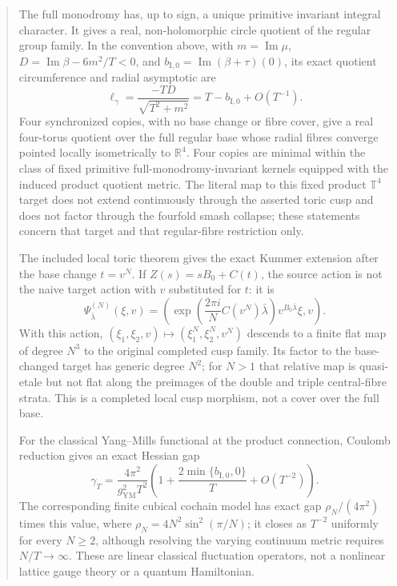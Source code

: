 \documentclass[11pt]{article}
\numberwithin{equation}{section}
\theoremstyle{definition}
\theoremstyle{remark}
\newcommand{\R}{\mathbb R}
\begin{document}
\begin{abstract}
The full monodromy has, up to sign, a unique primitive invariant integral character.  It gives a real, non-holomorphic circle quotient of the regular group family.  In the convention above, with $m=\operatorname{Im}\mu$, $D=\operatorname{Im}\beta-6m^2/T<0$, and $b_{\mathrm I,0}=\operatorname{Im}(\beta+\tau)(0)$, its exact quotient circumference and radial asymptotic are
\[
 \ell_\gamma=\frac{-TD}{\sqrt{T^2+m^2}}
 =T-b_{\mathrm I,0}+O(T^{-1}).
\]
Four synchronized copies, with no base change or fibre cover, give a real four-torus quotient over the full regular base whose radial fibres converge pointed locally isometrically to $\R^4$.  Four copies are minimal within the class of fixed primitive full-monodromy-invariant kernels equipped with the induced product quotient metric.  The literal map to this fixed product $\mathbb T^4$ target does not extend continuously through the asserted toric cusp and does not factor through the fourfold smash collapse; these statements concern that target and that regular-fibre restriction only.

The included local toric theorem gives the exact Kummer extension after the
base change $t=v^N$.  If $Z(s)=sB_0+C(t)$, the source action is not the
naive target action with $v$ substituted for $t$: it is
\[
 \Psi^{(N)}_{\bar\lambda}(\xi,v)
 =\left(\exp\!\left(\frac{2\pi i}{N}C(v^N)\bar\lambda\right)
 v^{B_0\bar\lambda}\xi,v\right).
\]
With this action, $(\xi_1,\xi_2,v)\mapsto
(\xi_1^N,\xi_2^N,v^N)$ descends to a finite flat map of degree $N^3$ to
the original completed cusp family.  Its factor to the base-changed target
has generic degree $N^2$; for $N>1$ that relative map is quasi-etale but not
flat along the preimages of the double and triple central-fibre strata.
This is a completed local cusp morphism, not a cover over the full base.

For the classical Yang--Mills functional at the product connection, Coulomb
reduction gives an exact Hessian gap
\[
 \gamma_T=\frac{4\pi^2}{g_{\mathrm{YM}}^2T^2}
 \left(1+\frac{2\min\{b_{\mathrm I,0},0\}}{T}+O(T^{-2})\right).
\]
The corresponding finite cubical cochain model has exact gap
$\rho_N/(4\pi^2)$ times this value, where
$\rho_N=4N^2\sin^2(\pi/N)$; it closes as $T^{-2}$ uniformly for every
$N\ge2$, although resolving the varying continuum metric requires
$N/T\to\infty$.  These are linear classical fluctuation operators, not a
nonlinear lattice gauge theory or a quantum Hamiltonian.


\end{abstract}
\end{document}
